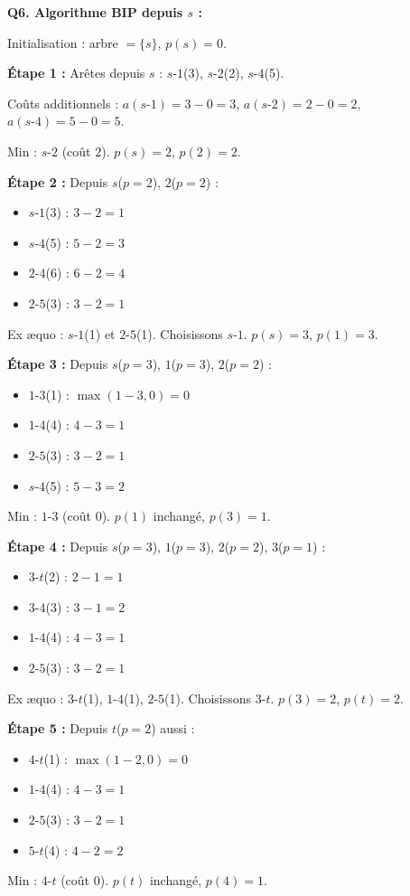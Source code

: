 \documentclass[12pt,a4paper]{article}
\begin{document}
\begin{correction}
\medskip
\textbf{Q6. Algorithme BIP depuis $s$ :}

Initialisation : arbre $= \{s\}$, $p(s) = 0$.

\textbf{\'Etape 1 :} Ar\^etes depuis $s$ : $s$-$1$(3), $s$-$2$(2), $s$-$4$(5).

Co\^uts additionnels : $a(s\text{-}1) = 3-0=3$, $a(s\text{-}2) = 2-0=2$, $a(s\text{-}4) = 5-0=5$.

Min : $s$-$2$ (co\^ut $2$). $p(s)=2$, $p(2)=2$.

\textbf{\'Etape 2 :} Depuis $s$($p=2$), $2$($p=2$) :
\begin{itemize}[nosep]
    \item $s$-$1$(3) : $3-2=1$
    \item $s$-$4$(5) : $5-2=3$
    \item $2$-$4$(6) : $6-2=4$
    \item $2$-$5$(3) : $3-2=1$
\end{itemize}
Ex \ae quo : $s$-$1$(1) et $2$-$5$(1). Choisissons $s$-$1$. $p(s)=3$, $p(1)=3$.

\textbf{\'Etape 3 :} Depuis $s$($p=3$), $1$($p=3$), $2$($p=2$) :
\begin{itemize}[nosep]
    \item $1$-$3$(1) : $\max(1-3,0)=0$
    \item $1$-$4$(4) : $4-3=1$
    \item $2$-$5$(3) : $3-2=1$
    \item $s$-$4$(5) : $5-3=2$
\end{itemize}
Min : $1$-$3$ (co\^ut $0$). $p(1)$ inchang\'e, $p(3)=1$.

\textbf{\'Etape 4 :} Depuis $s$($p=3$), $1$($p=3$), $2$($p=2$), $3$($p=1$) :
\begin{itemize}[nosep]
    \item $3$-$t$(2) : $2-1=1$
    \item $3$-$4$(3) : $3-1=2$
    \item $1$-$4$(4) : $4-3=1$
    \item $2$-$5$(3) : $3-2=1$
\end{itemize}
Ex \ae quo : $3$-$t$(1), $1$-$4$(1), $2$-$5$(1). Choisissons $3$-$t$. $p(3)=2$, $p(t)=2$.

\textbf{\'Etape 5 :} Depuis $t$($p=2$) aussi :
\begin{itemize}[nosep]
    \item $4$-$t$(1) : $\max(1-2,0)=0$
    \item $1$-$4$(4) : $4-3=1$
    \item $2$-$5$(3) : $3-2=1$
    \item $5$-$t$(4) : $4-2=2$
\end{itemize}
Min : $4$-$t$ (co\^ut $0$). $p(t)$ inchang\'e, $p(4)=1$.


\end{correction}
\end{document}

